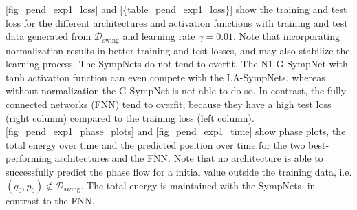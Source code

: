 \documentclass[twoside,a4paper]{article}
\begin{document}
\cref{fig_pend_exp1_loss} and \cref{{table_pend_exp1_loss}} show the training and test loss for the different architectures
and activation functions with training and test data generated from $\mathcal{D}_{\text{swing}}$ and learning rate $\gamma = 0.01$.
Note that incorporating normalization results in better training and test losses, and may also stabilize
the learning process. The SympNets do not tend to overfit.
The N1-G-SympNet with tanh activation function can even compete with the LA-SympNets, whereas
without normalization the G-SympNet is not able to do so.
In contrast, the fully-connected networks (FNN) tend to overfit, because they have a high test loss (right column) 
compared to the training loss (left column).
\cref{fig_pend_exp1_phase_plots} and \cref{fig_pend_exp1_time} show phase plots, the total energy over time
and the predicted position over time for the two best-performing architectures and the FNN.
Note that no architecture is able to successfully predict the phase flow for a initial value outside the training data,
i.e. $(q_0, p_0) \notin \mathcal{D}_{\text{swing}}$.
The total energy is maintained with the SympNets, in contrast to the FNN.
\end{document}
